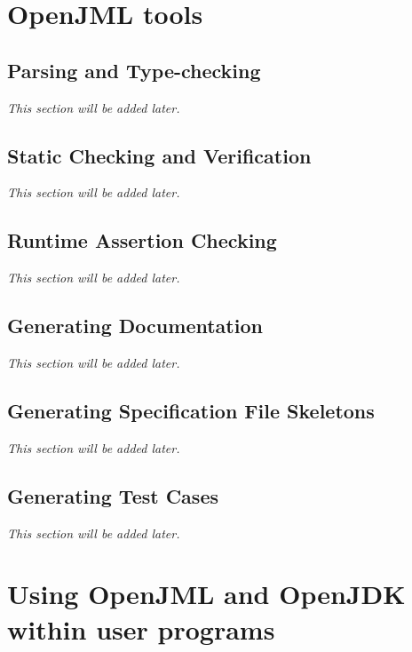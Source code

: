 \documentclass{report}%
\begin{document}
\chapter{OpenJML tools}

\section{Parsing and Type-checking}
\textit{This section will be added later.} %

\section{Static Checking and Verification}
\textit{This section will be added later.} %

\section{Runtime Assertion Checking}
\textit{This section will be added later.} %

\section{Generating Documentation}
\textit{This section will be added later.} %

\section{Generating Specification File Skeletons}
\textit{This section will be added later.} %

\section{Generating Test Cases}
\textit{This section will be added later.} %

\chapter{Using OpenJML and OpenJDK within user programs}
\end{document}
